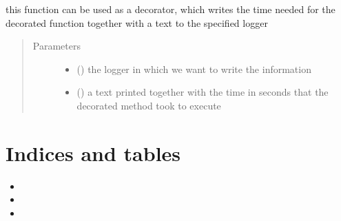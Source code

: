 \documentclass[letterpaper,10pt,english]{sphinxmanual}
\begin{document}
\begin{fulllineitems}
\label{\detokenize{event_log_analyzer:event_log_analyzer.utils.log_time}}
\sphinxAtStartPar
this function can be used as a decorator, which writes the time needed for the decorated function together with a text to the specified logger
\begin{quote}\begin{description}
\item[{Parameters}] \leavevmode\begin{itemize}
\item {} 
\sphinxAtStartPar
{} () \textendash{} the logger in which we want to write the information

\item {} 
\sphinxAtStartPar
{} () \textendash{} a text printed together with the time in seconds that the decorated method took to execute

\end{itemize}

\end{description}\end{quote}

\end{fulllineitems}



\chapter{Indices and tables}
\label{\detokenize{index:indices-and-tables}}\begin{itemize}
\item {} 
\sphinxAtStartPar
{}

\item {} 
\sphinxAtStartPar
{}

\item {} 
\sphinxAtStartPar
{}

\end{itemize}
\end{document}
